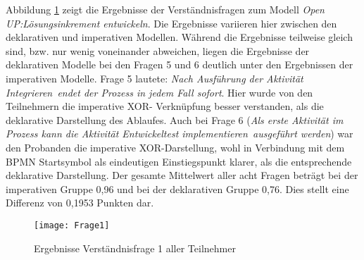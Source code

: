 Abbildung \ref{fig:Frage1} zeigt die Ergebnisse der Verständnisfragen zum Modell \textit{Open UP:Lösungsinkrement entwickeln}. Die Ergebnisse variieren hier zwischen den deklarativen und imperativen Modellen. Während die Ergebnisse teilweise gleich sind, bzw. nur wenig voneinander abweichen, liegen die Ergebnisse der deklarativen Modelle bei den Fragen 5 und 6 deutlich unter den Ergebnissen der imperativen Modelle. \newline
Frage 5 lautete: \textit{Nach Ausführung der Aktivität \grqq Integrieren\grqq \ endet der Prozess in jedem Fall sofort}. Hier wurde von den Teilnehmern die imperative XOR- Verknüpfung besser verstanden, als die deklarative Darstellung des Ablaufes. Auch bei Frage 6 (\textit{Als erste Aktivität im Prozess kann die Aktivität \grqq Entwickeltest implementieren\grqq \ ausgeführt werden}) war den Probanden die imperative XOR-Darstellung, wohl in Verbindung mit dem BPMN Startsymbol als eindeutigen Einstiegspunkt klarer, als die entsprechende deklarative Darstellung.\newline
Der gesamte Mittelwert aller acht Fragen beträgt bei der imperativen Gruppe 0,96 und bei der deklarativen Gruppe 0,76. Dies stellt eine Differenz von 0,1953 Punkten dar. \newline

\begin{figure}[htp]
\begin{center}
  \texttt{[image: Frage1]} %
  \caption{Ergebnisse Verständnisfrage 1 aller Teilnehmer}
  \label{fig:Frage1}
\end{center}
\end{figure}


